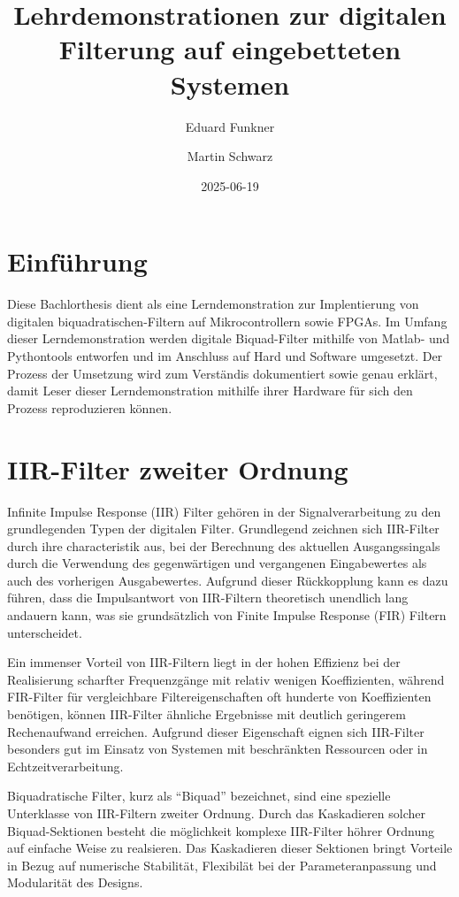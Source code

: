 \documentclass[
  ngerman,
  letterpaper,
  DIV=11]{scrreprt}
\title{Lehrdemonstrationen zur digitalen Filterung auf eingebetteten
Systemen}
\author{Eduard Funkner \and Martin Schwarz}
\date{2025-06-19}
\renewcommand*\contentsname{Inhaltsverzeichnis}
\newcommand\contentsname{Inhaltsverzeichnis}
\begin{document}
\maketitle

\renewcommand*\contentsname{Inhaltsverzeichnis}
{
\hypersetup{linkcolor=}
\setcounter{tocdepth}{2}
\tableofcontents
}

\section{Einführung}\label{einfuxfchrung}

Diese Bachlorthesis dient als eine Lerndemonstration zur Implentierung
von digitalen biquadratischen-Filtern auf Mikrocontrollern sowie FPGAs.
Im Umfang dieser Lerndemonstration werden digitale Biquad-Filter
mithilfe von Matlab- und Pythontools entworfen und im Anschluss auf Hard
und Software umgesetzt. Der Prozess der Umsetzung wird zum Verständis
dokumentiert sowie genau erklärt, damit Leser dieser Lerndemonstration
mithilfe ihrer Hardware für sich den Prozess reproduzieren können.

\section{IIR-Filter zweiter Ordnung}\label{iir-filter-zweiter-ordnung}

Infinite Impulse Response (IIR) Filter gehören in der Signalverarbeitung
zu den grundlegenden Typen der digitalen Filter. Grundlegend zeichnen
sich IIR-Filter durch ihre characteristik aus, bei der Berechnung des
aktuellen Ausgangssingals durch die Verwendung des gegenwärtigen und
vergangenen Eingabewertes als auch des vorherigen Ausgabewertes.
Aufgrund dieser Rückkopplung kann es dazu führen, dass die Impulsantwort
von IIR-Filtern theoretisch unendlich lang andauern kann, was sie
grundsätzlich von Finite Impulse Response (FIR) Filtern unterscheidet.

Ein immenser Vorteil von IIR-Filtern liegt in der hohen Effizienz bei
der Realisierung scharfter Frequenzgänge mit relativ wenigen
Koeffizienten, während FIR-Filter für vergleichbare Filtereigenschaften
oft hunderte von Koeffizienten benötigen, können IIR-Filter ähnliche
Ergebnisse mit deutlich geringerem Rechenaufwand erreichen. Aufgrund
dieser Eigenschaft eignen sich IIR-Filter besonders gut im Einsatz von
Systemen mit beschränkten Ressourcen oder in Echtzeitverarbeitung.

Biquadratische Filter, kurz als ``Biquad'' bezeichnet, sind eine
spezielle Unterklasse von IIR-Filtern zweiter Ordnung. Durch das
Kaskadieren solcher Biquad-Sektionen besteht die möglichkeit komplexe
IIR-Filter höhrer Ordnung auf einfache Weise zu realsieren. Das
Kaskadieren dieser Sektionen bringt Vorteile in Bezug auf numerische
Stabilität, Flexibilät bei der Parameteranpassung und Modularität des
Designs.
\end{document}
